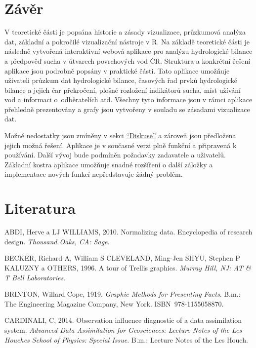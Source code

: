 \documentclass[12pt,]{article}
\begin{document}
\newpage

\section*{Závěr}\label{zaver}

\qquad V teoretické části je popsána historie a zásady vizualizace,
průzkumová analýza dat, základní a pokročilé vizualizační nástroje v R.
Na základě teoretické části je následně vytvořená interaktivní webová
aplikace pro analýzu hydrologické bilance a předpověď sucha v útvarech
povrchových vod ČR. Struktura a konkrétní řešení aplikace jsou podrobně
popsány v praktické části. Tato aplikace umožňuje uživateli průzkum dat
hydrologické bilance, časových řad prvků hydrologické bilance a jejich
čar překročení, plošné rozložení indikátorů sucha, míst užívání vod a
informaci o~odběratelích atd. Všechny tyto informace jsou v rámci
aplikace přehledně prezentovány a grafy jsou vytvořeny v souladu se
zásadami vizualizace dat.

\qquad Možné nedostatky jsou zmíněny v sekci
\protect\hyperlink{diskuse}{\enquote{Diskuse}} a zároveň jsou předložena
jejich možná řešení. Aplikace je v současné verzi plně funkční a
připravená k používání. Další vývoj bude podmíněn požadavky zadavatele a
uživatelů. Základní kostra aplikace umožňuje snadné rozšíření o další
záložky a implementace nových funkcí nepředstavuje žádný problém.

\newpage

\section{Literatura}\label{literatura}

\label{literatura}

\hypertarget{refs}{}
\hypertarget{ref-normalizing}{}
ABDI, Herve a LJ WILLIAMS, 2010. Normalizing data. Encyclopedia of
research design. \emph{Thousand Oaks, CA: Sage}.

\hypertarget{ref-trellisplot}{}
BECKER, Richard A, William S CLEVELAND, Ming-Jen SHYU, Stephen P KALUZNY
a OTHERS, 1996. A tour of Trellis graphics. \emph{Murray Hill, NJ: AT \&
T Bell Laboratories}.

\hypertarget{ref-brinton_1919}{}
BRINTON, Willard Cope, 1919. \emph{Graphic Methods for Presenting
Facts}. B.m.: The Engineering Magazine Company, New York.
ISBN~978-1155058870.

\hypertarget{ref-leverages_regression}{}
CARDINALI, C, 2014. Observation influence diagnostic of a data
assimilation system. \emph{Advanced Data Assimilation for Geosciences:
Lecture Notes of the Les Houches School of Physics: Special Issue}.
B.m.: Lecture Notes of the Les Houch.
\end{document}
